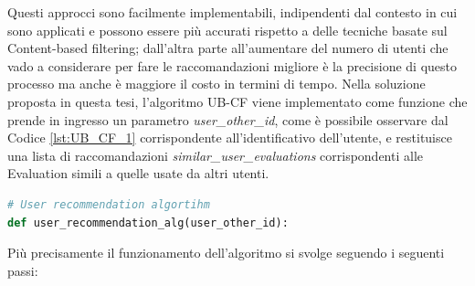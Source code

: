 \hfill\break
Questi approcci sono facilmente implementabili, indipendenti dal contesto in cui sono applicati e possono essere più accurati rispetto 
a delle tecniche basate sul Content-based filtering; dall'altra parte all'aumentare del numero di utenti che vado a considerare per fare le 
raccomandazioni migliore è la precisione di questo processo ma anche è maggiore il costo in termini di tempo.\hfill\break
Nella soluzione proposta in questa tesi, l'algoritmo UB-CF viene implementato come funzione che prende in ingresso un parametro 
\textit{user\_other\_id}, come è possibile osservare dal Codice \ref{lst:UB_CF_1} corrispondente all'identificativo dell'utente, 
e restituisce una lista di raccomandazioni \textit{similar\_user\_evaluations} corrispondenti alle Evaluation simili a quelle usate 
da altri utenti.
%
\lstset{style=python_code_style}
\begin{lstlisting}[language=Python, label=lst:UB_CF_1, caption={\ }]
# User recommendation algortihm
def user_recommendation_alg(user_other_id):
\end{lstlisting}
%
Più precisamente il funzionamento dell'algoritmo si svolge seguendo i seguenti passi:

